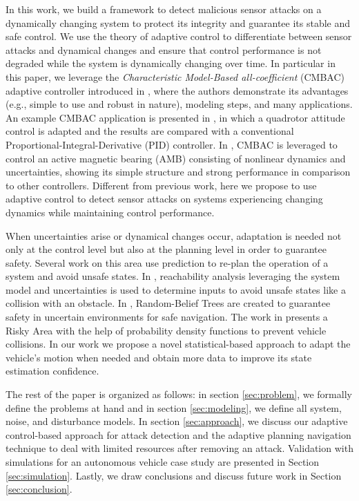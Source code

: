 In this work, we build a framework to detect malicious sensor attacks on a dynamically changing system to protect its integrity and guarantee its stable and safe control. We use the theory of adaptive control to differentiate between sensor attacks and dynamical changes and ensure that control performance is not degraded while the system is dynamically changing over time. 
In particular in this paper, we leverage the \textit{Characteristic Model-Based all-coefficient} (CMBAC) adaptive controller introduced in \cite{4106038}, where the authors demonstrate its advantages (e.g., simple to use and robust in nature), modeling steps, and many applications. An example CMBAC application is presented in \cite{7578288}, in which a quadrotor attitude control is adapted and the results are compared with a conventional Proportional-Integral-Derivative (PID) controller. In \cite{Di2014}, CMBAC is leveraged to control an active magnetic bearing (AMB) consisting of nonlinear dynamics and uncertainties, showing its simple structure and strong performance in comparison to other controllers. Different from previous work, here we propose to use adaptive control to detect sensor attacks on systems experiencing changing dynamics while maintaining control performance.






When uncertainties arise or dynamical changes occur, adaptation is needed not only at the control level but also at the planning level in order to guarantee safety. Several work on this area use prediction to re-plan the operation of a system and avoid unsafe states. In \cite{8463205}, reachability analysis leveraging the system model and uncertainties is used to determine inputs to avoid unsafe states like a collision with an obstacle. In \cite{5980508}, Random-Belief Trees are created to guarantee safety in uncertain environments for safe navigation. The work in \cite{6934041} presents a Risky Area with the help of probability density functions to prevent vehicle collisions. In our work we propose a novel statistical-based approach to adapt the vehicle's motion when needed and obtain more data to improve its state estimation confidence.

The rest of the paper is organized as follows: in section \ref{sec:problem}, we formally define the problems at hand and in section \ref{sec:modeling}, we define all system, noise, and disturbance models. In section \ref{sec:approach}, we discuss our adaptive control-based approach for attack detection and the adaptive planning navigation technique to deal with limited resources after removing an attack. Validation with simulations for an autonomous vehicle case study are presented in Section \ref{sec:simulation}. Lastly, we draw conclusions and discuss future work in Section \ref{sec:conclusion}.


